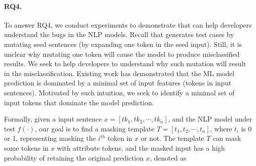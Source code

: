 %
%

\paragraph{RQ4.} 

To answer RQ4, we conduct experiments to demonstrate that \tool can
help developers understand the bugs in the NLP models.  Recall that
\tool generates test cases by mutating seed sentences (\eg by
expanding one token in the seed input). Still, it is unclear why
mutating one token will cause the model to produce misclassified
results.  We seek to help developers to understand why such mutation
will result in the misclassification.  Existing work
\cite{simin2020denas, lemna, lime} has demonstrated that the ML model
prediction is dominated by a minimal set of input features (\ie tokens
in input sentences). Motivated by such intuition, we seek to identify
a minimal set of input tokens that dominate the model prediction.

Formally, given a input sentence $x = [tk_1, tk_2, \cdots, tk_n]$, and
the NLP model under test $f(\cdot)$, our goal is to find a masking
template $T = [t_1, t_2, \cdots, t_n]$, where $t_i$ is 0 or 1,
representing masking the $i^{th}$ token in $x$ or not.  The template
$T$ can mask some tokens in $x$ with attribute tokens, and the masked
input has a high probability of retaining the original prediction $x$,
denoted as

